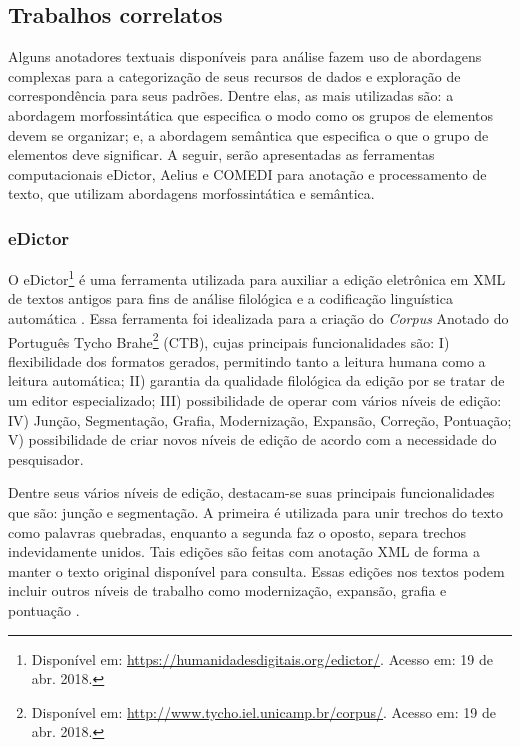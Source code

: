 \documentclass[portuguese]{textolivre}
\begin{document}
\subsection{Trabalhos correlatos}\label{sec-titulo}
Alguns anotadores textuais disponíveis para análise fazem uso de abordagens complexas para a categorização de seus recursos de dados e exploração de correspondência para seus padrões. Dentre elas, as mais utilizadas são: a abordagem morfossintática que especifica o modo como os grupos de elementos devem se organizar; e, a abordagem semântica que especifica o que o grupo de elementos deve significar. A seguir, serão apresentadas as ferramentas computacionais eDictor, Aelius e COMEDI para anotação e processamento de texto, que utilizam abordagens morfossintática e semântica.

\subsubsection{eDictor}\label{sec-autores}

O eDictor\footnote{Disponível em: \url{https://humanidadesdigitais.org/edictor/}. Acesso em: 19 de abr. 2018.} é uma ferramenta utilizada para auxiliar a edição eletrônica em XML de textos antigos para fins de análise filológica e a codificação linguística automática \cite{sousa_o_2014}. Essa ferramenta foi idealizada para a criação do \textit{Corpus} Anotado do Português Tycho Brahe\footnote{Disponível em: \url{http://www.tycho.iel.unicamp.br/corpus/}. Acesso em: 19 de abr. 2018.} (CTB), cujas  principais funcionalidades são: I) flexibilidade dos formatos gerados, permitindo tanto a leitura humana como a leitura automática; II) garantia da qualidade filológica da edição por se tratar de um editor especializado; III) possibilidade de operar com vários níveis de edição: IV) Junção, Segmentação, Grafia, Modernização, Expansão, Correção, Pontuação; V) possibilidade de criar novos níveis de edição de acordo com a necessidade do pesquisador.

Dentre seus vários níveis de edição, destacam-se suas principais funcionalidades que são: junção e segmentação. A primeira é utilizada para unir trechos do texto como palavras quebradas, enquanto a segunda faz o oposto, separa trechos indevidamente unidos. Tais edições são feitas com anotação XML de forma a manter o texto original disponível para consulta. Essas edições nos textos podem incluir outros níveis de trabalho como modernização, expansão, grafia e pontuação \cite{sousa_o_2014, sousa_e-dictor:_2010, sousa_uma_2016}.
\end{document}
